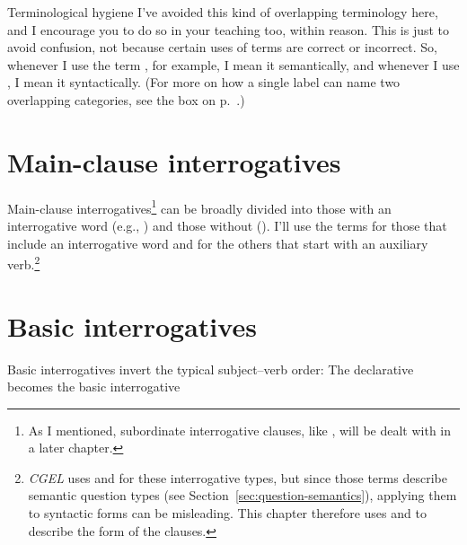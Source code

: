\begin{tblsframed}{Terminological hygiene}
    I've avoided this kind of overlapping terminology here, and I encourage you to do so in your teaching too, within reason. This is just to avoid confusion, not because certain uses of terms are correct or incorrect. So, whenever I use the term , for example, I mean it semantically, and whenever I use , I mean it syntactically. (For more on how a single label can name two overlapping categories, see the box on p.~\pageref{box:one-label-two-things}.)
\end{tblsframed}






\section{Main-clause interrogatives}

Main-clause interrogatives\footnote{As I mentioned, subordinate interrogative clauses, like , will be dealt with in a later chapter.} can be broadly divided into those with an interrogative word (e.g., ) and those without (). I'll use the terms  for those that include an interrogative word and  for the others that start with an auxiliary verb.\footnote{\textit{CGEL} uses  and  for these interrogative types, but since those terms describe semantic question types (see Section~\ref{sec:question-semantics}), applying them to syntactic forms can be misleading. This chapter therefore uses  and  to describe the form of the clauses.}

\section{Basic interrogatives}\label{sec:basic-int}

Basic interrogatives invert the typical subject--verb order: The declarative  becomes the basic interrogative  

